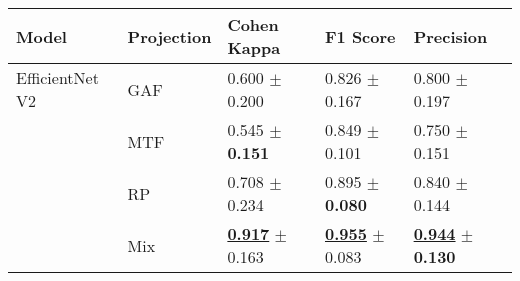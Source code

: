 
\begin{tabular}[t]{lllll}
\toprule
Model & Projection & Cohen Kappa & F1 Score & Precision \\
\midrule
EfficientNet V2 & GAF & \textcolor[rgb]{0.8530612245,0.1469387755,0}{0.600} $\pm$ \textcolor[rgb]{0.5890220097,0.4109779903,0}{0.200} & \textcolor[rgb]{1.0000000000,0.0000000000,0}{0.826} $\pm$ \textcolor[rgb]{1.0000000000,0.0000000000,0}{0.167} & \textcolor[rgb]{0.7428571429,0.2571428571,0}{0.800} $\pm$ \textcolor[rgb]{1.0000000000,0.0000000000,0}{0.197} \\
 & MTF & \textcolor[rgb]{1.0000000000,0.0000000000,0}{0.545} $\pm$ \textbf{\textcolor[rgb]{0.0000000000,0.5000000000,0}{0.151}} & \textcolor[rgb]{0.8209876543,0.1790123457,0}{0.849} $\pm$ \textcolor[rgb]{0.2410868124,0.5000000000,0}{0.101} & \textcolor[rgb]{1.0000000000,0.0000000000,0}{0.750} $\pm$ \textcolor[rgb]{0.3114153487,0.5000000000,0}{0.151} \\
 & RP & \textcolor[rgb]{0.5612244898,0.4387755102,0}{0.708} $\pm$ \textcolor[rgb]{1.0000000000,0.0000000000,0}{0.234} & \textcolor[rgb]{0.4629629630,0.5000000000,0}{0.895} $\pm$ \textbf{\textcolor[rgb]{0.0000000000,0.5000000000,0}{0.080}} & \textcolor[rgb]{0.5357142857,0.4642857143,0}{0.840} $\pm$ \textcolor[rgb]{0.2135623148,0.5000000000,0}{0.144} \\
 & Mix & \underline{\textbf{\textcolor[rgb]{0.0000000000,0.5000000000,0}{0.917}}} $\pm$ \textcolor[rgb]{0.1444802924,0.5000000000,0}{0.163} & \underline{\textbf{\textcolor[rgb]{0.0000000000,0.5000000000,0}{0.955}}} $\pm$ \textcolor[rgb]{0.0326396716,0.5000000000,0}{0.083} & \underline{\textbf{\textcolor[rgb]{0.0000000000,0.5000000000,0}{0.944}}} $\pm$ \textbf{\textcolor[rgb]{0.0000000000,0.5000000000,0}{0.130}} \\
\bottomrule
\end{tabular}

